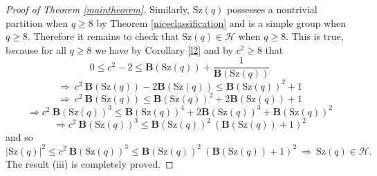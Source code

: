 \documentclass{amsart}
\theoremstyle{definition}
\numberwithin{equation}{section}
\begin{document}
\begin{proof}[Proof of Theorem \ref{maintheorem}]
Similarly, $\mathrm{Sz}(q)$ possesses a nontrivial partition when $q \ge 8$ by Theorem \ref{niceclassification} and is a simple group when $q \ge 8$. Therefore it remains to check that $\mathrm{Sz}(q) \in \mathcal{H}$ when $q \ge 8$.   This is true, because for all $q \ge 8$ we have by Corollary \ref{l2} and by $c^2 \ge 8 $ that
\begin{equation} 0 \le c^2 -2   \le  {\mathbf{B}(\mathrm{Sz}(q))} + \frac{1}{\mathbf{B}(\mathrm{Sz}(q))}
\end{equation}   
\begin{equation}
\Longrightarrow  \  c^2 \  {\mathbf{B}(\mathrm{Sz}(q))}  - 2  {\mathbf{B}(\mathrm{Sz}(q))} \le  {\mathbf{B}(\mathrm{Sz}(q))}^2  +1  
\end{equation}   
\begin{equation}
   \Longrightarrow  \  c^2 \  \mathbf{B}(\mathrm{Sz}(q)) \le  \mathbf{B}(\mathrm{Sz}(q))^2 + 2   \mathbf{B}(\mathrm{Sz}(q)) +1  
   \end{equation}   
\begin{equation}
 \Longrightarrow  c^2  \ \mathbf{B}(\mathrm{Sz}(q))^3 \le   {\mathbf{B}(\mathrm{Sz}(q))}^4 +   2 { \mathbf{B}(\mathrm{Sz}(q))}^3 +    {\mathbf{B}(\mathrm{Sz}(q))}^2 
 \end{equation}   
\begin{equation}
 \Longrightarrow  c^2  \ \mathbf{B}(\mathrm{Sz}(q))^3 \le   {\mathbf{B}(\mathrm{Sz}(q))}^2  \ {( \mathbf{B}(\mathrm{Sz}(q))+1)}^2
 \end{equation}   
and so
\begin{equation}
|\mathrm{Sz}(q)|^2  \le  c^2  \ \mathbf{B}(\mathrm{Sz}(q))^3 \le   {\mathbf{B}(\mathrm{Sz}(q))}^2  \ {( \mathbf{B}(\mathrm{Sz}(q))+1)}^2   \ \Longrightarrow \ \mathrm{Sz}(q) \in \mathcal{H}.
\end{equation}   
The result (iii) is completely proved.
%
\medskip
\medskip
\medskip
\medskip
\medskip
\medskip
\medskip
\medskip


\end{proof}
\end{document}
